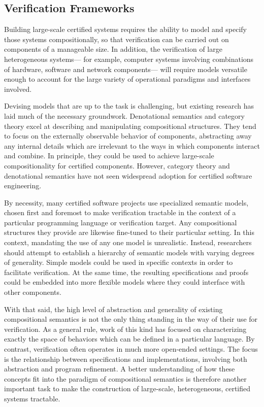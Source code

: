 \documentclass[acmsmall,screen,review,anonymous]{acmart}
\begin{document}

\subsection{Verification Frameworks} \label{sec:intro:bigpict} %

Building large-scale certified systems
requires the ability
to model and specify those systems compositionally,
so that verification can be carried out
on components of a manageable size.
In addition,
the verification of large heterogeneous systems---%
for example,
computer systems involving combinations of
hardware, software and network components---%
will require models versatile enough
to account for the large variety of
operational paradigms and interfaces involved.

Devising models that are up to the task is challenging,
but existing research has laid much of the necessary groundwork.
Denotational semantics and category theory
excel at describing and manipulating compositional structures.
They tend to focus on the externally observable behavior of components,
abstracting away any internal details which are irrelevant
to the ways in which components interact and combine.
In principle,
they could be used to achieve
large-scale compositionality for certified components.
However,
category theory and denotational semantics
have not seen widespread adoption
for certified software engineering.

By necessity,
many certified software projects use
specialized semantic models,
chosen first and foremost
to make verification tractable
in the context of a particular
programming language or verification target.
Any compositional structures they provide
are likewise fine-tuned to their particular setting.
In this context,
mandating the use of any one model
is unrealistic.
Instead,
researchers should attempt to establish
a hierarchy of semantic models
with varying degrees of generality.
Simple models could be used
in specific contexts in order to facilitate verification.
At the same time,
the resulting specifications and proofs
could be embedded into more flexible models
where they could interface
with other components.

With that said,
the high level of abstraction and generality of
existing compositional semantics
is not the only thing
standing in the way of their use for verification.
As a general rule,
work of this kind has focused on characterizing exactly
the space of behaviors which can be defined in a particular language.
By contrast,
verification often operates in much more open-ended settings.
The focus is the relationship between specifications and implementations,
involving both abstraction and program refinement.
A better understanding of how these concepts fit into
the paradigm of compositional semantics
is therefore another important task
to make the construction of
large-scale, heterogeneous, certified systems
tractable.
\end{document}
